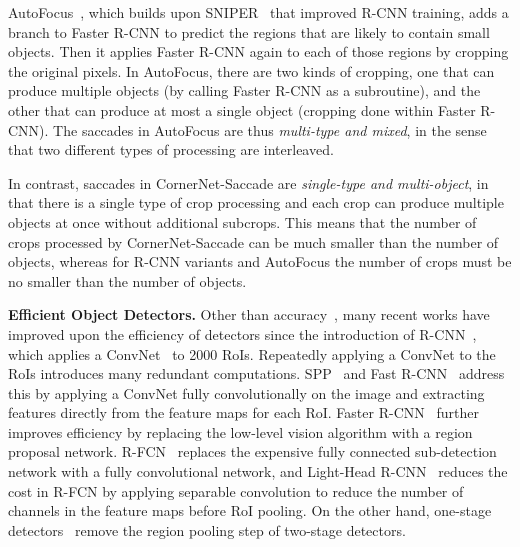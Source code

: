 \documentclass{bmvc2k}
\begin{document}
AutoFocus~\cite{najibi2018autofocus}, which builds upon SNIPER~\cite{singh2018sniper} that improved R-CNN training, adds a branch to Faster R-CNN to predict the regions that are likely to contain small objects. Then it applies Faster R-CNN again to each of those regions by cropping the original pixels. In AutoFocus, there are two kinds of cropping, one that can produce multiple objects (by calling Faster R-CNN as a subroutine), and the other that can produce at most a single object (cropping done within Faster R-CNN). The saccades in AutoFocus are thus \emph{multi-type and mixed}, in the sense that two different types of processing are interleaved. 

In contrast, saccades in CornerNet-Saccade are \emph{single-type and multi-object}, in that there is a single type of crop processing and each crop can produce multiple objects at once without additional subcrops. This means that the number of crops processed by CornerNet-Saccade can be much smaller than the number of objects, whereas for R-CNN variants and AutoFocus the number of crops must be no smaller than the number of objects.

\smallskip \noindent \textbf{Efficient Object Detectors.} Other than accuracy~\cite{cai2016unified,shrivastava2016beyond,huang2017speed,lin2017feature,dai2017deformable,zhu2018deformable,he2017mask,peng2018megdet,singh2018analysis,zhai2018feature,xu2018deep,cheng2018revisiting,jiang2018acquisition}, many recent works have improved upon the efficiency of detectors since the introduction of R-CNN~\cite{girshick2014rich}, which applies a ConvNet~\cite{krizhevsky2012imagenet} to 2000 RoIs. Repeatedly applying a ConvNet to the RoIs introduces many redundant computations. SPP~\cite{he2015spatial} and Fast R-CNN~\cite{girshick2015fast} address this by applying a ConvNet fully convolutionally on the image and extracting features directly from the feature maps for each RoI. Faster R-CNN~\cite{ren2015faster} further improves efficiency by replacing the low-level vision algorithm with a region proposal network. R-FCN~\cite{dai2016r} replaces the expensive fully connected sub-detection network with a fully convolutional network, and Light-Head R-CNN~\cite{li2017light} reduces the cost in R-FCN by applying separable convolution to reduce the number of channels in the feature maps before RoI pooling. On the other hand, one-stage detectors~\cite{liu2016ssd,redmon2016you,fu2017dssd,redmon2017yolo9000,lin2017focal,wang2017point,kong2017ron,jeong2017enhancement,zhang2018single,zhao2018m2det,shen2017dsod,zhang2018singleencried} remove the region pooling step of two-stage detectors.
\end{document}
